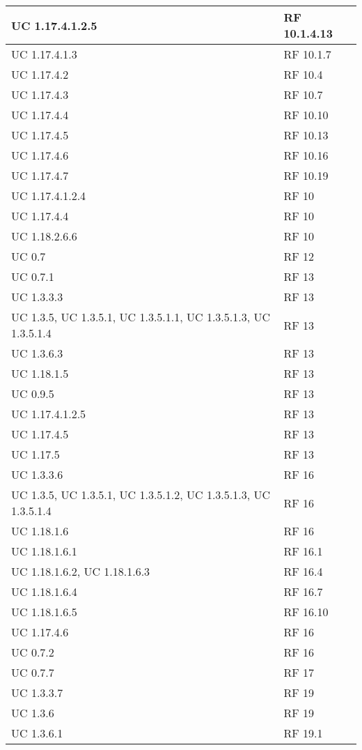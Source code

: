 {\begin{longtable} [c]{| p{4cm} | p{4cm} |}
 \hline 
UC 1.17.4.1.2.5 & RF 10.1.4.13\\ 
 \hline 
UC 1.17.4.1.3 & RF 10.1.7\\ 
 \hline 
UC 1.17.4.2 & RF 10.4\\ 
 \hline 
UC 1.17.4.3 & RF 10.7\\ 
 \hline 
UC 1.17.4.4 & RF 10.10\\ 
 \hline 
UC 1.17.4.5 & RF 10.13\\ 
 \hline 
UC 1.17.4.6 & RF 10.16\\ 
 \hline 
UC 1.17.4.7 & RF 10.19\\ 
 \hline 
UC 1.17.4.1.2.4 & RF 10\\ 
 \hline 
UC 1.17.4.4 & RF 10\\ 
 \hline 
UC 1.18.2.6.6 & RF 10\\ 
 \hline 
UC 0.7 & RF 12\\ 
 \hline 
UC 0.7.1 & RF 13\\ 
 \hline 
UC 1.3.3.3 & RF 13\\ 
 \hline 
UC 1.3.5, UC 1.3.5.1, UC 1.3.5.1.1, UC 1.3.5.1.3, UC 1.3.5.1.4 & RF 13\\ 
 \hline 
UC 1.3.6.3 & RF 13\\ 
 \hline 
UC 1.18.1.5 & RF 13\\ 
 \hline 
UC 0.9.5 & RF 13\\ 
 \hline 
UC 1.17.4.1.2.5 & RF 13\\ 
 \hline 
UC 1.17.4.5 & RF 13\\ 
 \hline 
UC 1.17.5 & RF 13\\ 
 \hline 
UC 1.3.3.6 & RF 16\\ 
 \hline 
UC 1.3.5, UC 1.3.5.1, UC 1.3.5.1.2, UC 1.3.5.1.3, UC 1.3.5.1.4 & RF 16\\ 
 \hline 
UC 1.18.1.6 & RF 16\\ 
 \hline 
UC 1.18.1.6.1 & RF 16.1\\ 
 \hline 
UC 1.18.1.6.2, UC 1.18.1.6.3 & RF 16.4\\ 
 \hline 
UC 1.18.1.6.4 & RF 16.7\\ 
 \hline 
UC 1.18.1.6.5 & RF 16.10\\ 
 \hline 
UC 1.17.4.6 & RF 16\\ 
 \hline 
UC 0.7.2 & RF 16\\ 
 \hline 
UC 0.7.7 & RF 17\\ 
 \hline 
UC 1.3.3.7 & RF 19\\ 
 \hline 
UC 1.3.6 & RF 19\\ 
 \hline 
UC 1.3.6.1 & RF 19.1\\ 

\end{longtable}}
